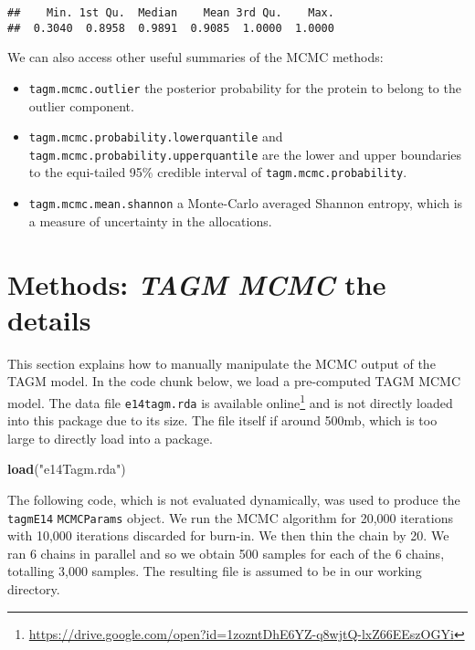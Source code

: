 \documentclass[9pt,a4paper,]{extarticle}
\newenvironment{Shaded}{\begin{snugshade}}{\end{snugshade}}
\newcommand{\KeywordTok}[1]{\textcolor[rgb]{0.13,0.29,0.53}{\textbf{#1}}}
\newcommand{\NormalTok}[1]{#1}
\newcommand{\StringTok}[1]{\textcolor[rgb]{0.31,0.60,0.02}{#1}}
\begin{document}
\begin{verbatim}
##    Min. 1st Qu.  Median    Mean 3rd Qu.    Max. 
##  0.3040  0.8958  0.9891  0.9085  1.0000  1.0000
\end{verbatim}

We can also access other useful summaries of the MCMC methods:

\begin{itemize}
\item
  \texttt{tagm.mcmc.outlier} the posterior probability for the protein
  to belong to the outlier component.
\item
  \texttt{tagm.mcmc.probability.lowerquantile} and \texttt{tagm.mcmc.probability.upperquantile}
  are the lower and upper boundaries to the equi-tailed 95\% credible interval
  of \texttt{tagm.mcmc.probability}.
\item
  \texttt{tagm.mcmc.mean.shannon} a Monte-Carlo averaged Shannon entropy,
  which is a measure of uncertainty in the allocations.
\end{itemize}

\hypertarget{methods-tagm-mcmc-the-details}{%
\section{\texorpdfstring{Methods: \emph{TAGM MCMC} the details}{Methods: TAGM MCMC the details}}\label{methods-tagm-mcmc-the-details}}

This section explains how to manually manipulate the MCMC output of
the TAGM model. In the code chunk below, we load a pre-computed
TAGM MCMC model. The data file \texttt{e14tagm.rda} is available online\footnote{\url{https://drive.google.com/open?id=1zozntDhE6YZ-q8wjtQ-lxZ66EEszOGYi}}
and is not directly loaded into this package due to its size. The file
itself if around 500mb, which is too large to directly load into a package.

\begin{Shaded}
\begin{Highlighting}[]
\KeywordTok{load}\NormalTok{(}\StringTok{"e14Tagm.rda"}\NormalTok{)}
\end{Highlighting}
\end{Shaded}

The following code, which is not evaluated dynamically, was used to
produce the \texttt{tagmE14} \texttt{MCMCParams} object. We run the MCMC algorithm
for 20,000 iterations with 10,000 iterations discarded for burn-in. We
then thin the chain by 20. We ran 6 chains in parallel and so we
obtain 500 samples for each of the 6 chains, totalling 3,000
samples. The resulting file is assumed to be in our working directory.
\end{document}
